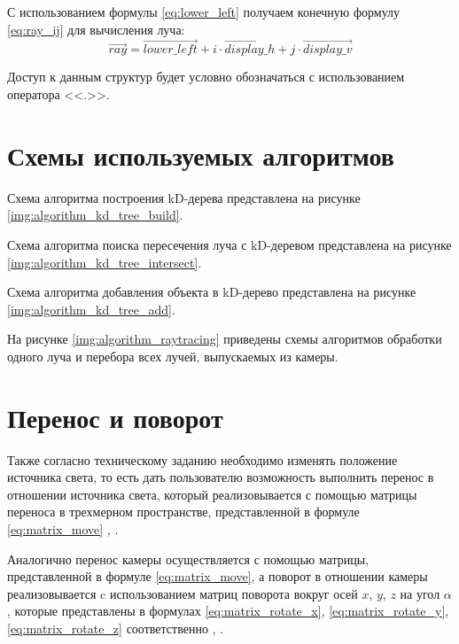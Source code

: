С использованием формулы \ref{eq:lower_left} получаем конечную формулу \ref{eq:ray_ij} для вычисления луча:
\begin{equation}\label{eq:ray_ij}
	\overrightarrow{ray} = \overrightarrow{lower\_left} + i \cdot \overrightarrow{display\_h} + j \cdot \overrightarrow{display\_v}
\end{equation}

Доступ к данным структур будет условно обозначаться с использованием оператора <<.>>.

\section{Схемы используемых алгоритмов}

Схема алгоритма построения kD-дерева представлена на рисунке \ref{img:algorithm_kd_tree_build}.


Схема алгоритма поиска пересечения луча с kD-деревом представлена на рисунке \ref{img:algorithm_kd_tree_intersect}.


Схема алгоритма добавления объекта в kD-дерево представлена на рисунке \ref{img:algorithm_kd_tree_add}.


На рисунке \ref{img:algorithm_raytracing} приведены схемы алгоритмов обработки одного луча и перебора всех лучей, выпускаемых из камеры.


\section{Перенос и поворот}

Также согласно техническому заданию необходимо изменять положение источника света, то есть дать пользователю возможность выполнить перенос в отношении источника света, который реализовывается с помощью матрицы переноса в трехмерном пространстве, представленной в формуле \ref{eq:matrix_move} \cite{куров}, \cite{боресков}.

Аналогично перенос камеры осуществляется с помощью матрицы, представленной в формуле \ref{eq:matrix_move}, а поворот в отношении камеры реализовывается c использованием матриц поворота вокруг осей $x$, $y$, $z$ на угол $\alpha$, которые представлены в формулах \ref{eq:matrix_rotate_x}, \ref{eq:matrix_rotate_y}, \ref{eq:matrix_rotate_z} соответственно \cite{куров}, \cite{боресков}.

